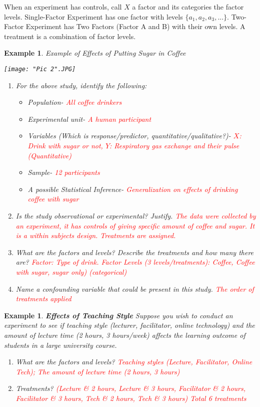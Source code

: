 \documentclass[a4paper,11pt]{article}
\newtheorem{eg}[thm]{Example}
\begin{document}
When an experiment has controls, call $X$ a {factor} and its categories the {factor levels}. Single-Factor Experiment has one factor with levels $\{a_1, a_2, a_3,...\}$. Two-Factor Experiment has Two Factors (Factor A and B) with their own levels. A {treatment} is a combination of factor levels. 
\newpage
\begin{eg}
\normalfont
Example of Effects of Putting Sugar in Coffee

	\texttt{[image: "Pic 2".JPG]}

\begin{enumerate}
\item For the above study, identify the following: 
\begin{itemize}
\item Population- \textcolor{red}{All coffee drinkers}
\item Experimental unit- \textcolor{red}{A human participant}
\item Variables (Which is response/predictor, quantitative/qualitative?)- \textcolor{red}{$X$: Drink with sugar or not, $Y$: Respiratory gas exchange and their pulse (Quantitative)}
\item Sample- \textcolor{red}{12 participants}
\item A possible Statistical Inference- \textcolor{red}{Generalization on effects of drinking coffee with sugar}
\end{itemize}
\item Is the study observational or {experimental}? Justify. \textcolor{red}{The data were collected by an experiment, it has controls of giving specific amount of coffee and sugar. It is a within subjects design. Treatments are assigned.}
\item What are the factors and levels? Describe the treatments and how many there are? \textcolor{red}{Factor: Type of drink. Factor Levels (3 levels/treatments): Coffee, Coffee with sugar, sugar only) (categorical)}
\item Name a confounding variable that could be present in this study. \textcolor{red}{The order of treatments applied}
\end{enumerate}
\end{eg}

\begin{eg}
\normalfont
\textbf{Effects of Teaching Style}
Suppose you wish to conduct an experiment to see if teaching style (lecturer, facilitator, online technology) and the amount of lecture time (2 hours, 3 hours/week) affects the learning outcome of students in a large university course. 

\begin{enumerate}
\item What are the factors and levels? \textcolor{red}{Teaching styles (Lecture, Facilitator, Online Tech); The amount of lecture time (2 hours, 3 hours)}
\item Treatments? \textcolor{red}{(Lecture \& 2 hours, Lecture \& 3 hours, Facilitator \& 2 hours, Facilitator \& 3 hours, Tech \& 2 hours, Tech \& 3 hours) Total 6 treatments}
\end{enumerate}
\end{eg}
\end{document}
